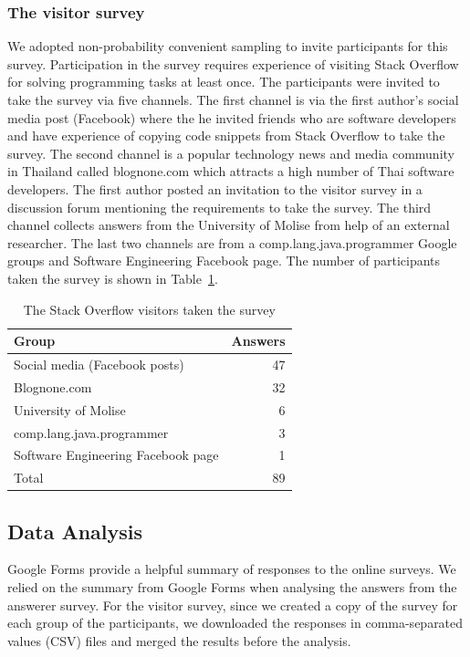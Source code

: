 \documentclass{svjour3}                     %
\begin{document}
\subsubsection{The visitor survey} 
We adopted non-probability convenient sampling to invite participants for this
survey. Participation in the survey requires experience of
visiting Stack Overflow for solving programming tasks at least once. The
participants were invited to take the survey via five channels. The first
channel is via the first author's social media post (Facebook) where the he
invited friends who are software developers and have experience of copying code
snippets from Stack Overflow to take the survey. The second channel is a popular
technology news and media community in Thailand called \textsf{blognone.com} which
attracts a high number of Thai software developers. The first author posted an
invitation to the visitor survey in a discussion forum mentioning the
requirements to take the survey. The third channel collects answers from the
University of Molise from help of an external researcher. The last two
channels are from a \textsf{comp.lang.java.programmer} Google groups and Software
Engineering Facebook page. The number of participants taken the survey is shown in
Table~\ref{tab:visitors}.

\begin{table}
	\centering
	\caption{The Stack Overflow visitors taken the survey}
	\label{tab:visitors}
	\begin{tabular}{lr}
		\toprule
		Group & Answers \\
		\midrule
		Social media (Facebook posts) & 47 \\
		Blognone.com & 32 \\
		University of Molise & 6 \\
		comp.lang.java.programmer & 3 \\
		Software Engineering Facebook page & 1 \\
		\midrule
		Total & 89 \\
		\bottomrule
	\end{tabular}
\end{table}

\subsection{Data Analysis}
Google Forms provide a helpful summary of responses to the online surveys. We
relied on the summary from Google Forms when analysing the answers from the
answerer survey. For the visitor survey, since we created a copy of the survey for each
group of the participants, we downloaded the responses in comma-separated values
(CSV) files and merged the results before the analysis.
\end{document}
